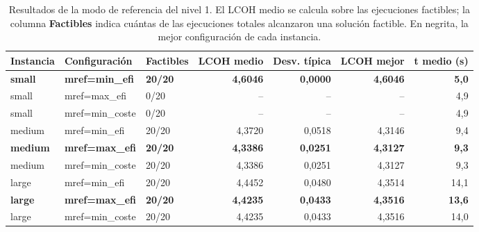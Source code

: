 \begin{table}[H]
    \centering
    \small
    \renewcommand{\arraystretch}{1.25}
    \begin{tabular}{lllrrrr}
        \hline
        \textbf{Instancia} & \textbf{Configuración} & \textbf{Factibles} & \textbf{LCOH medio} & \textbf{Desv. típica} & \textbf{LCOH mejor} & \textbf{t medio (s)} \\
        \hline
        \textbf{small} & \textbf{mref=min\_efi} & \textbf{20/20} & \textbf{4,6046} & \textbf{0,0000} & \textbf{4,6046} & \textbf{5,0} \\
        small & mref=max\_efi & 0/20 & -- & -- & -- & 4,9 \\
        small & mref=min\_coste & 0/20 & -- & -- & -- & 4,9 \\
        \hline
        medium & mref=min\_efi & 20/20 & 4,3720 & 0,0518 & 4,3146 & 9,4 \\
        \textbf{medium} & \textbf{mref=max\_efi} & \textbf{20/20} & \textbf{4,3386} & \textbf{0,0251} & \textbf{4,3127} & \textbf{9,3} \\
        medium & mref=min\_coste & 20/20 & 4,3386 & 0,0251 & 4,3127 & 9,3 \\
        \hline
        large & mref=min\_efi & 20/20 & 4,4452 & 0,0480 & 4,3514 & 14,1 \\
        \textbf{large} & \textbf{mref=max\_efi} & \textbf{20/20} & \textbf{4,4235} & \textbf{0,0433} & \textbf{4,3516} & \textbf{13,6} \\
        large & mref=min\_coste & 20/20 & 4,4235 & 0,0433 & 4,3516 & 14,0 \\
        \hline
    \end{tabular}
    \caption{Resultados de la modo de referencia del nivel 1. El LCOH medio se calcula sobre las ejecuciones factibles; la columna \textbf{Factibles} indica cuántas de las ejecuciones totales alcanzaron una solución factible. En negrita, la mejor configuración de cada instancia.}
    \label{tab:calib_e09_mref}
\end{table}
